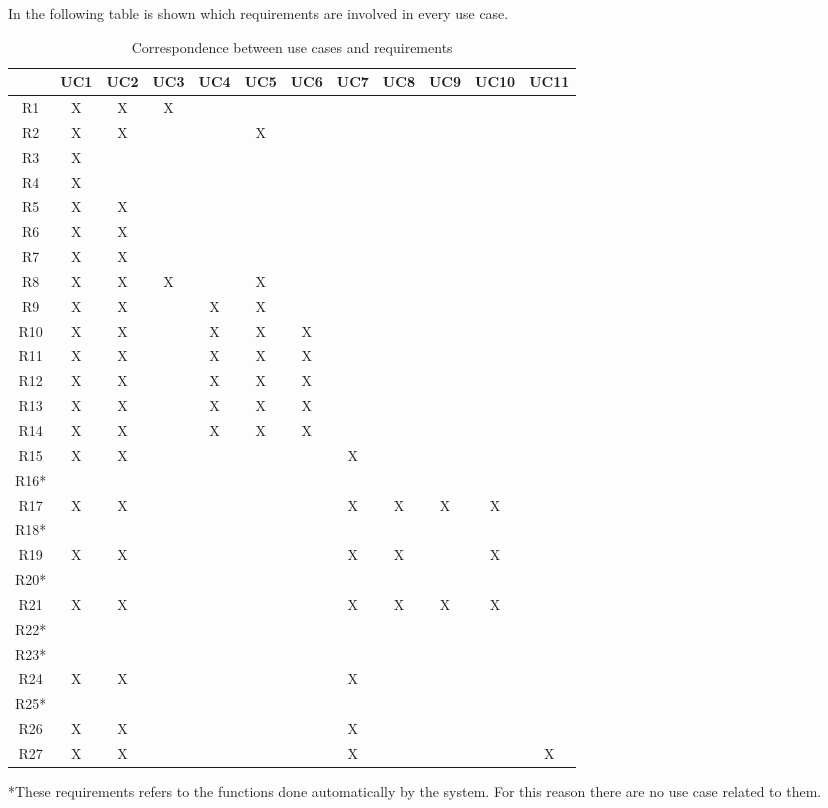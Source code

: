 \documentclass[a4paper]{report}
\begin{document}
In the following table is shown which requirements are involved in every use case.
\begin{table}[H]  
  \centering
  \begin{tabular}{|c|c|c|c|c|c|c|c|c|c|c|c|}
    \cline{2-12}
    \multicolumn{1}{c|}{} & UC1 & UC2 & UC3 & UC4 & UC5 & UC6 & UC7 & UC8 & UC9 & UC10 & UC11 \\ \hline
    R1 & X & 
    
    X & X &  &  &  &  &  &  &  &  \\ \hline
    R2 & X & X &  &  & X &  &  &  &  &  &  \\ \hline
    R3 & X &  &  &  &  &  &  &  &  &  &  \\ \hline
    R4 & X &  &  &  &  &  &  &  &  &  &  \\ \hline
    R5 & X & X &  &  &  &  &  &  &  &  &  \\ \hline
    R6 & X & X &  &  &  &  &  &  &  &  &  \\ \hline
    R7 & X & X &  &  &  &  &  &  &  &  &  \\ \hline
    R8 & X & X & X &  & X &  &  &  &  &  &  \\ \hline
    R9 & X & X &  & X & X &  &  &  &  &  &  \\ \hline
    R10 & X & X &  & X & X & X &  &  &  &  &  \\ \hline
    R11 & X & X &  & X & X & X &  &  &  &  &  \\ \hline
    R12 & X & X &  & X & X & X &  &  &  &  &  \\ \hline
    R13 & X & X &  & X & X & X &  &  &  &  &  \\ \hline
    R14 & X & X &  & X & X & X &  &  &  &  &  \\ \hline
    R15 & X & X &  &  &  &  & X &  &  &  &  \\ \hline
    R16* &  &  &  &  &  &  &  &  &  &  &  \\ \hline
    R17 & X & X &  &  &  &  & X & X & X & X &  \\ \hline
    R18* &  &  &  &  &  &  &  &  &  &  &  \\ \hline
    R19 & X & X &  &  &  &  & X & X &   & X &  \\ \hline
    R20* &  &  &  &  &  &  &  &  &  &  &  \\ \hline
    R21 & X & X &  &  &  &  & X & X & X & X &  \\ \hline
    R22* &  &  &  &  &  &  &  &  &  &  &  \\ \hline
    R23* &  &  &  &  &  &  &  &  &  &  &  \\ \hline
    R24 & X & X &  &  &  &  & X &  &  &  &  \\ \hline
    R25* &  &  &  &  &  &  &  &  &  &  &  \\ \hline
    R26 & X & X &  &  &  &  & X &  &  &  &  \\ \hline
    R27 & X & X &  &  &  &  & X &  &  &  &  X\\ \hline
  \end{tabular}
  \caption{Correspondence between use cases and requirements}
\end{table}
*These requirements refers to the functions done automatically by the system. For this reason there are no use case related to them.
\end{document}
